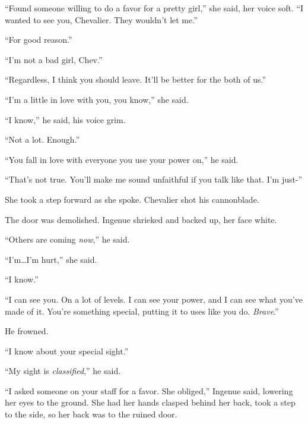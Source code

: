 ``Found someone willing to do a favor for a pretty girl,'' she said, her voice soft.  ``I wanted to see you, Chevalier.  They wouldn't let me.''



``For good reason.''



``I'm not a bad girl, Chev.''



``Regardless, I think you should leave.  It'll be better for the both of us.''



``I'm a little in love with you, you know,'' she said.



``I know,'' he said, his voice grim.



``Not a lot.  Enough.''



``You fall in love with everyone you use your power on,'' he said.



``That's not true.  You'll make me sound unfaithful if you talk like that.  I'm just-''



She took a step forward as she spoke.  Chevalier shot his cannonblade.



The door was demolished.  Ingenue shrieked and backed up, her face white.



``Others are coming \emph{now},'' he said.



``I'm\ldots I'm hurt,'' she said.



``I know.''



``I can see you.  On a lot of levels.  I can see your power, and I can see what you've made of it.  You're something special, putting it to uses like you do.  \emph{Brave}.''



He frowned.



``I know about your special sight.''



``My sight is \emph{classified},'' he said.



``I asked someone on your staff for a favor.  She obliged,'' Ingenue said, lowering her eyes to the ground.  She had her hands clasped behind her back, took a step to the side, so her back was to the ruined door.



